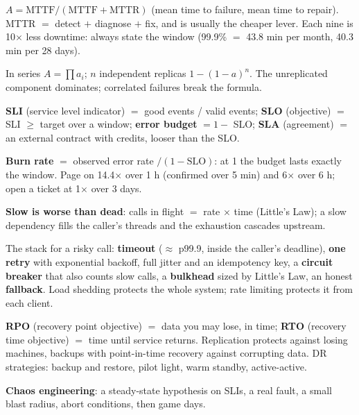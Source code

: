 \stages{\stClarify\ \stEstimate\ \stDeep}

\begin{know}
  \item $A = \text{MTTF}/(\text{MTTF} + \text{MTTR})$ (mean time to failure, mean time to repair). MTTR $=$ detect $+$ diagnose $+$ fix, and is usually the cheaper lever. Each nine is 10$\times$ less downtime: always state the window (99.9\% $=$ 43.8 min per month, 40.3 min per 28 days).
  \item In series $A = \prod a_i$; $n$ independent replicas $1 - (1-a)^n$. The unreplicated component dominates; correlated failures break the formula.
  \item \textbf{SLI} (service level indicator) $=$ good events / valid events; \textbf{SLO} (objective) $=$ SLI $\ge$ target over a window; \textbf{error budget} $= 1 - $ SLO; \textbf{SLA} (agreement) $=$ an external contract with credits, looser than the SLO.
  \item \textbf{Burn rate} $=$ observed error rate $/ (1 - \text{SLO})$: at 1 the budget lasts exactly the window. Page on 14.4$\times$ over 1 h (confirmed over 5 min) and 6$\times$ over 6 h; open a ticket at 1$\times$ over 3 days.
  \item \textbf{Slow is worse than dead}: calls in flight $=$ rate $\times$ time (Little's Law); a slow dependency fills the caller's threads and the exhaustion cascades upstream.
  \item The stack for a risky call: \textbf{timeout} ($\approx$ p99.9, inside the caller's deadline), \textbf{one retry} with exponential backoff, full jitter and an idempotency key, a \textbf{circuit breaker} that also counts slow calls, a \textbf{bulkhead} sized by Little's Law, an honest \textbf{fallback}. Load shedding protects the whole system; rate limiting protects it from each client.
  \item \textbf{RPO} (recovery point objective) $=$ data you may lose, in time; \textbf{RTO} (recovery time objective) $=$ time until service returns. Replication protects against losing machines, backups with point-in-time recovery against corrupting data. DR strategies: backup and restore, pilot light, warm standby, active-active.
  \item \textbf{Chaos engineering}: a steady-state hypothesis on SLIs, a real fault, a small blast radius, abort conditions, then game days.
\end{know}


